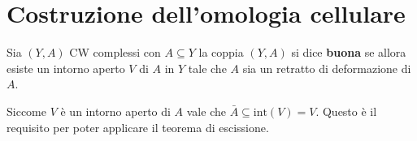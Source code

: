 
\section{Costruzione dell'omologia cellulare}

\begin{definition}
  Sia $ (Y,A) $ CW complessi con $ A \subseteq Y $
  la coppia $ (Y,A) $ si dice \textbf{buona} se
  allora esiste un intorno aperto $ V $ di $ A $ in $ Y $ tale che $ A $
  sia un retratto di deformazione di $ A $.
\end{definition}
\begin{osservation}
  Siccome $ V $ è un intorno aperto di $ A $ vale
  che $ \bar{A} \subseteq \mathrm{int}(V) = V $. Questo è il requisito per poter
  applicare il teorema di escissione.
\end{osservation}


